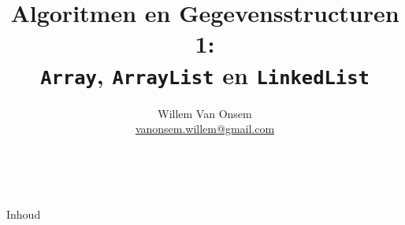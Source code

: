 \documentclass[handout]{beamer}
\title{Algoritmen en Gegevensstructuren 1:\\ \texttt{Array}, \texttt{ArrayList} en \texttt{LinkedList}}
\author{Willem Van Onsem\\ \href{mailto:vanonsem.willem@gmail.com?Subject=Presentatie\%20Algoritmen\%20en\%20Gegevensstructuren\%201}{vanonsem.willem@gmail.com}}
\theoremstyle{remark}
\begin{document}
\begin{frame}
\maketitle
\vfill
\begin{center}\\[2.5ex]{\tiny\CcNote{\CcLongnameByNcSa}}\vspace*{-2.5ex}
\end{center}
\end{frame}
\begin{frame}[plain]{Inhoud}
\begin{multicols}{2}
\tableofcontents
\end{multicols}
\end{frame}




\end{document}
